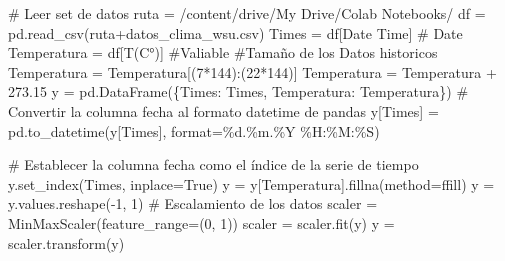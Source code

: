\documentclass[
  us-letterpaper,
]{scrreprt}
\newenvironment{Shaded}{\begin{snugshade}}{\end{snugshade}}
\newcommand{\BuiltInTok}[1]{\textcolor[rgb]{0.00,0.23,0.31}{#1}}
\newcommand{\CommentTok}[1]{\textcolor[rgb]{0.37,0.37,0.37}{#1}}
\newcommand{\DecValTok}[1]{\textcolor[rgb]{0.68,0.00,0.00}{#1}}
\newcommand{\FloatTok}[1]{\textcolor[rgb]{0.68,0.00,0.00}{#1}}
\newcommand{\NormalTok}[1]{\textcolor[rgb]{0.00,0.23,0.31}{#1}}
\newcommand{\OperatorTok}[1]{\textcolor[rgb]{0.37,0.37,0.37}{#1}}
\newcommand{\SpecialCharTok}[1]{\textcolor[rgb]{0.37,0.37,0.37}{#1}}
\newcommand{\StringTok}[1]{\textcolor[rgb]{0.13,0.47,0.30}{#1}}
\newcommand{\VariableTok}[1]{\textcolor[rgb]{0.07,0.07,0.07}{#1}}
\theoremstyle{plain}
\theoremstyle{definition}
\theoremstyle{definition}
\theoremstyle{remark}
\begin{document}
\begin{Shaded}
\begin{Highlighting}[]
\CommentTok{\# Leer set de datos}
\NormalTok{ruta }\OperatorTok{=} \StringTok{\textquotesingle{}/content/drive/My Drive/Colab Notebooks/\textquotesingle{}}
\NormalTok{df }\OperatorTok{=}\NormalTok{ pd.read\_csv(ruta}\OperatorTok{+}\StringTok{\textquotesingle{}datos\_clima\_wsu.csv\textquotesingle{}}\NormalTok{)}
\NormalTok{Times }\OperatorTok{=}\NormalTok{ df[}\StringTok{\textquotesingle{}Date Time\textquotesingle{}}\NormalTok{] }\CommentTok{\# Date}
\NormalTok{Temperatura }\OperatorTok{=}\NormalTok{ df[}\StringTok{\textquotesingle{}T(C°)\textquotesingle{}}\NormalTok{] }\CommentTok{\#Valiable}
\CommentTok{\#Tamaño de los Datos historicos}
\NormalTok{Temperatura }\OperatorTok{=}\NormalTok{ Temperatura[(}\DecValTok{7}\OperatorTok{*}\DecValTok{144}\NormalTok{):(}\DecValTok{22}\OperatorTok{*}\DecValTok{144}\NormalTok{)] }
\NormalTok{Temperatura }\OperatorTok{=}\NormalTok{ Temperatura }\OperatorTok{+} \FloatTok{273.15} 
\NormalTok{y }\OperatorTok{=}\NormalTok{ pd.DataFrame(\{}\StringTok{\textquotesingle{}Times\textquotesingle{}}\NormalTok{: Times, }\StringTok{\textquotesingle{}Temperatura\textquotesingle{}}\NormalTok{: Temperatura\})}
\CommentTok{\# Convertir la columna \textquotesingle{}fecha\textquotesingle{} al formato datetime de pandas}
\NormalTok{y[}\StringTok{\textquotesingle{}Times\textquotesingle{}}\NormalTok{] }\OperatorTok{=}\NormalTok{ pd.to\_datetime(y[}\StringTok{\textquotesingle{}Times\textquotesingle{}}\NormalTok{], }\BuiltInTok{format}\OperatorTok{=}\StringTok{\textquotesingle{}}\SpecialCharTok{\%d}\StringTok{.\%m.\%Y \%H:\%M:\%S\textquotesingle{}}\NormalTok{)}

\CommentTok{\# Establecer la columna \textquotesingle{}fecha\textquotesingle{} como el índice de la serie de tiempo}
\NormalTok{y.set\_index(}\StringTok{\textquotesingle{}Times\textquotesingle{}}\NormalTok{, inplace}\OperatorTok{=}\VariableTok{True}\NormalTok{)}
\NormalTok{y }\OperatorTok{=}\NormalTok{ y[}\StringTok{\textquotesingle{}Temperatura\textquotesingle{}}\NormalTok{].fillna(method}\OperatorTok{=}\StringTok{\textquotesingle{}ffill\textquotesingle{}}\NormalTok{)}
\NormalTok{y }\OperatorTok{=}\NormalTok{ y.values.reshape(}\OperatorTok{{-}}\DecValTok{1}\NormalTok{, }\DecValTok{1}\NormalTok{)}
\CommentTok{\# Escalamiento de  los datos}
\NormalTok{scaler }\OperatorTok{=}\NormalTok{ MinMaxScaler(feature\_range}\OperatorTok{=}\NormalTok{(}\DecValTok{0}\NormalTok{, }\DecValTok{1}\NormalTok{))}
\NormalTok{scaler }\OperatorTok{=}\NormalTok{ scaler.fit(y)}
\NormalTok{y }\OperatorTok{=}\NormalTok{ scaler.transform(y)}


\end{Highlighting}
\end{Shaded}
\end{document}
